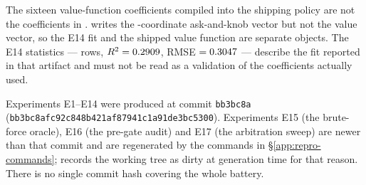 The sixteen value-function coefficients compiled into the shipping policy are
not the coefficients in .
 writes the \numParams{}-coordinate ask-and-knob
vector but not the value vector, so the E14 fit and the shipped value function
are separate objects. The E14 statistics --- \numValueRows{} rows,
$R^2 = 0.2909$, RMSE $= 0.3047$ --- describe the fit reported in
that artifact and must not be read as a validation of the coefficients actually
used.

Experiments E1--E14 were produced at commit \texttt{bb3bc8a}
(\texttt{bb3bc8afc92c848b421af87941c1a91de3bc5300}). Experiments E15
(the brute-force oracle), E16 (the pre-gate audit) and E17 (the arbitration
sweep) are newer than that commit and are regenerated by the commands in
\S\ref{app:repro-commands};  records
the working tree as dirty at generation time for that reason. There is no single
commit hash covering the whole battery.
